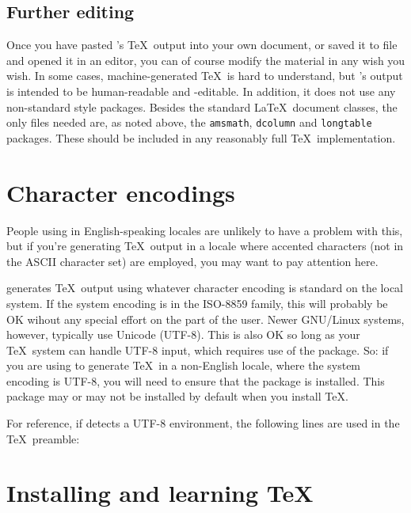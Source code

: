 \subsection{Further editing}

Once you have pasted 's \TeX\ output into your own
document, or saved it to file and opened it in an editor, you can of
course modify the material in any wish you wish.  In some cases,
machine-generated \TeX\ is hard to understand, but 's
output is intended to be human-readable and -editable.  In addition,
it does not use any non-standard style packages.  Besides the standard
\LaTeX\ document classes, the only files needed are, as noted above,
the \verb+amsmath+, \verb+dcolumn+ and \verb+longtable+ packages.
These should be included in any reasonably full \TeX\ implementation.


\section{Character encodings}
\label{tex-encode}

People using  in English-speaking locales are unlikely to
have a problem with this, but if you're generating \TeX\ output in a
locale where accented characters (not in the ASCII character set) are
employed, you may want to pay attention here.

 generates \TeX\ output using whatever character encoding
is standard on the local system.  If the system encoding is in the
ISO-8859 family, this will probably be OK wihout any special effort on
the part of the user.  Newer GNU/Linux systems, however, typically use
Unicode (UTF-8).  This is also OK so long as your \TeX\ system can
handle UTF-8 input, which requires use of the  package.
So: if you are using  to generate \TeX\ in a non-English
locale, where the system encoding is UTF-8, you will need to ensure
that the  package is installed.  This package may or
may not be installed by default when you install \TeX{}.

For reference, if  detects a UTF-8 environment, the
following lines are used in the \TeX\ preamble:
%
\begin{code}
\usepackage{ucs}
\usepackage[utf8x]{inputenc}
\end{code}


\section{Installing and learning \TeX}
\label{tex-install}

